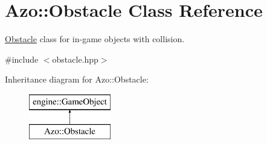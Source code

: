\hypertarget{class_azo_1_1_obstacle}{}\section{Azo\+:\+:Obstacle Class Reference}
\label{class_azo_1_1_obstacle}


\hyperlink{class_azo_1_1_obstacle}{Obstacle} class for in-\/game objects with collision.  




{\ttfamily \#include $<$obstacle.\+hpp$>$}

Inheritance diagram for Azo\+:\+:Obstacle\+:\begin{figure}[H]
\begin{center}
\leavevmode
\includegraphics[height=2.000000cm]{class_azo_1_1_obstacle}
\end{center}
\end{figure}
